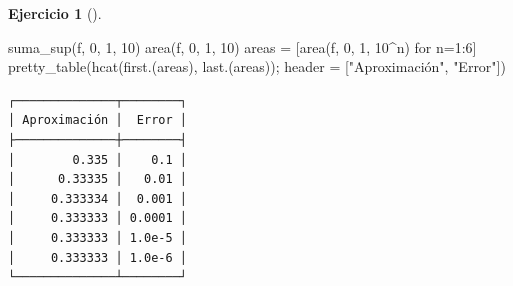 \documentclass[
  a4paper,
]{scrreport}
\newenvironment{Shaded}{\begin{snugshade}}{\end{snugshade}}
\newcommand{\FloatTok}[1]{\textcolor[rgb]{0.68,0.00,0.00}{#1}}
\newcommand{\FunctionTok}[1]{\textcolor[rgb]{0.28,0.35,0.67}{#1}}
\newcommand{\NormalTok}[1]{\textcolor[rgb]{0.00,0.23,0.31}{#1}}
\newcommand{\OperatorTok}[1]{\textcolor[rgb]{0.37,0.37,0.37}{#1}}
\newcommand{\StringTok}[1]{\textcolor[rgb]{0.13,0.47,0.30}{#1}}
\theoremstyle{definition}
\newtheorem{exercise}{Ejercicio}[chapter]
\theoremstyle{remark}
\begin{document}
\begin{exercise}[]
\begin{enumerate}
\begin{tcolorbox}
\begin{Shaded}
\begin{Highlighting}[]
\FunctionTok{suma\_sup}\NormalTok{(f, }\FloatTok{0}\NormalTok{, }\FloatTok{1}\NormalTok{, }\FloatTok{10}\NormalTok{)  }
\FunctionTok{area}\NormalTok{(f, }\FloatTok{0}\NormalTok{, }\FloatTok{1}\NormalTok{, }\FloatTok{10}\NormalTok{)}
\NormalTok{areas }\OperatorTok{=}\NormalTok{ [}\FunctionTok{area}\NormalTok{(f, }\FloatTok{0}\NormalTok{, }\FloatTok{1}\NormalTok{, }\FloatTok{10}\OperatorTok{\^{}}\NormalTok{n) for n}\OperatorTok{=}\FloatTok{1}\OperatorTok{:}\FloatTok{6}\NormalTok{]}
\FunctionTok{pretty\_table}\NormalTok{(}\FunctionTok{hcat}\NormalTok{(}\FunctionTok{first}\NormalTok{.(areas), }\FunctionTok{last}\NormalTok{.(areas)); header }\OperatorTok{=}\NormalTok{ [}\StringTok{"Aproximación"}\NormalTok{, }\StringTok{"Error"}\NormalTok{])}
\end{Highlighting}
\end{Shaded}

\begin{verbatim}
┌──────────────┬────────┐
│ Aproximación │  Error │
├──────────────┼────────┤
│        0.335 │    0.1 │
│      0.33335 │   0.01 │
│     0.333334 │  0.001 │
│     0.333333 │ 0.0001 │
│     0.333333 │ 1.0e-5 │
│     0.333333 │ 1.0e-6 │
└──────────────┴────────┘
\end{verbatim}

  \end{tcolorbox}
\end{enumerate}

\end{exercise}
\end{document}
